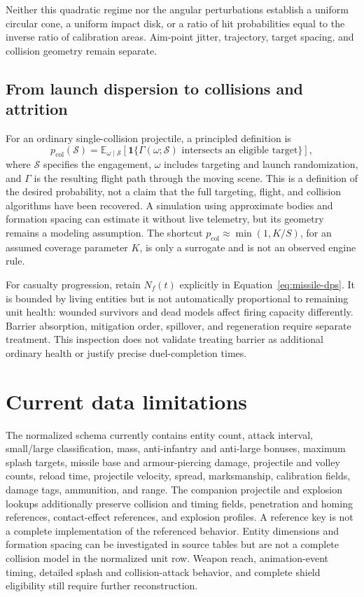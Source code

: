 \documentclass[11pt]{article}
\begin{document}
Neither this quadratic regime nor the angular perturbations establish a
uniform circular cone, a uniform impact disk, or a ratio of hit probabilities
equal to the inverse ratio of calibration areas.  Aim-point jitter,
trajectory, target spacing, and collision geometry remain separate.

\subsection{From launch dispersion to collisions and attrition}

For an ordinary single-collision projectile, a principled definition is
\begin{equation}
  p_{\mathrm{col}}(\mathcal S)=
  \mathbb E_{\omega\mid\mathcal S}
  \left[\mathbf 1\{
    \Gamma(\omega;\mathcal S)
    \text{ intersects an eligible target}
  \}\right],
  \label{eq:missile-collision-expectation}
\end{equation}
where $\mathcal S$ specifies the engagement, $\omega$ includes targeting and
launch randomization, and $\Gamma$ is the resulting flight path through the
moving scene.  This is a definition of the desired probability, not a claim
that the full targeting, flight, and collision algorithms have been recovered.
A simulation using approximate bodies and formation spacing can estimate
it without live telemetry, but its geometry remains a modeling assumption.
The shortcut $p_{\mathrm{col}}\approx\min(1,K/S)$, for an assumed coverage
parameter $K$, is only a surrogate and is not an observed engine rule.

For casualty progression, retain $N_f(t)$ explicitly in
Equation~\ref{eq:missile-dps}.  It is bounded by living entities but is not
automatically proportional to remaining unit health: wounded survivors and
dead models affect firing capacity differently.  Barrier absorption,
mitigation order, spillover, and regeneration require separate treatment.
This inspection does not validate treating barrier as additional ordinary
health or justify precise duel-completion times.

\section{Current data limitations}

The normalized schema currently contains entity count, attack interval,
small/large classification, mass, anti-infantry and anti-large bonuses,
maximum splash targets, missile base and armour-piercing damage, projectile
and volley counts, reload time, projectile velocity, spread, marksmanship,
calibration fields, damage tags, ammunition, and range.  The companion
projectile and explosion lookups additionally preserve collision and timing
fields, penetration and homing references, contact-effect references, and
explosion profiles.  A reference key is not a complete implementation of the
referenced behavior.  Entity dimensions and formation spacing can be
investigated in source tables but are not a complete collision model in the
normalized unit row.  Weapon reach, animation-event timing, detailed splash
and collision-attack behavior, and complete shield eligibility still require
further reconstruction.
\end{document}
